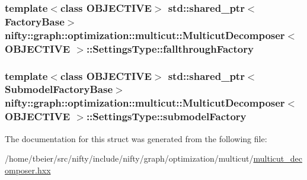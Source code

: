 \subsubsection[{fallthrough\+Factory}]{\setlength{\rightskip}{0pt plus 5cm}template$<$class O\+B\+J\+E\+C\+T\+I\+V\+E$>$ std\+::shared\+\_\+ptr$<${\bf Factory\+Base}$>$ {\bf nifty\+::graph\+::optimization\+::multicut\+::\+Multicut\+Decomposer}$<$ O\+B\+J\+E\+C\+T\+I\+V\+E $>$\+::Settings\+Type\+::fallthrough\+Factory}\label{structnifty_1_1graph_1_1optimization_1_1multicut_1_1MulticutDecomposer_1_1SettingsType_a718df2feaec8752e14fa403737eb2bc4}
\hypertarget{structnifty_1_1graph_1_1optimization_1_1multicut_1_1MulticutDecomposer_1_1SettingsType_ae81a9cbe54a40113c9d053895c361235}{}
\subsubsection[{submodel\+Factory}]{\setlength{\rightskip}{0pt plus 5cm}template$<$class O\+B\+J\+E\+C\+T\+I\+V\+E$>$ std\+::shared\+\_\+ptr$<${\bf Submodel\+Factory\+Base}$>$ {\bf nifty\+::graph\+::optimization\+::multicut\+::\+Multicut\+Decomposer}$<$ O\+B\+J\+E\+C\+T\+I\+V\+E $>$\+::Settings\+Type\+::submodel\+Factory}\label{structnifty_1_1graph_1_1optimization_1_1multicut_1_1MulticutDecomposer_1_1SettingsType_ae81a9cbe54a40113c9d053895c361235}


The documentation for this struct was generated from the following file\+:\begin{DoxyCompactItemize}
\item 
/home/tbeier/src/nifty/include/nifty/graph/optimization/multicut/\hyperlink{multicut__decomposer_8hxx}{multicut\+\_\+decomposer.\+hxx}\end{DoxyCompactItemize}
